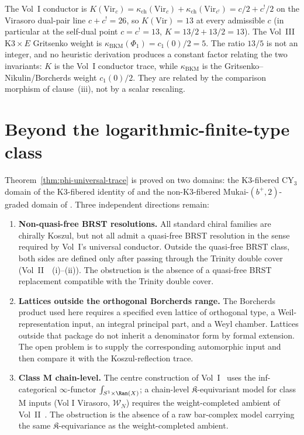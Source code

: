 \begin{remark}
\label{rem:factor-13-caveat}
The Vol~I conductor is
$K(\mathrm{Vir}_c) = \kappa_{\mathrm{ch}}(\mathrm{Vir}_c) + \kappa_{\mathrm{ch}}(\mathrm{Vir}_{c^!})
= c/2 + c^!/2$ on the Virasoro dual-pair line $c + c^! = 26$, so
$K(\mathrm{Vir}) = 13$ at every admissible $c$ (in particular at the
self-dual point $c = c^! = 13$, $K = 13/2 + 13/2 = 13$). The Vol~III
K$3 \times E$ Gritsenko weight is
$\kappa_{\mathrm{BKM}}(\Phi_1) = c_1(0)/2 = 5$. The ratio $13/5$ is not
an integer, and no heuristic derivation produces a constant factor
relating the two invariants: $K$ is the Vol~I conductor trace, while
$\kappa_{\mathrm{BKM}}$ is the Gritsenko--Nikulin/Borcherds weight
$c_1(0)/2$. They are related by the comparison morphism of clause~(iii),
not by a scalar rescaling.
\end{remark}

\section{Beyond the logarithmic-finite-type class}
\label{sec:phi-trace-frontier}

Theorem~\ref{thm:phi-universal-trace} is proved on two domains: the
K$3$-fibered CY$_3$ domain of
the K3-fibered identity of \cite{VolI} and the non-K$3$-fibered
Mukai-$(b^+, 2)$-graded domain of
\cite{VolI}. Three independent
directions remain:

\begin{enumerate}[label=\textup{(\alph*)}]
 \item \textbf{Non-quasi-free BRST resolutions.} All standard chiral
 families are chirally Koszul, but not all admit a quasi-free
 BRST resolution in the sense required by Vol~I's universal
 conductor. Outside the quasi-free BRST class, both sides are
 defined only after passing through the Trinity double cover
 \textup{(}Vol~II~\cite{VolII}~(i)--(ii)\textup{).}
 The obstruction is the absence of a quasi-free BRST replacement
 compatible with the Trinity double cover.
 \item \textbf{Lattices outside the orthogonal Borcherds range.} The
 Borcherds product used here requires a specified even lattice of
 orthogonal type, a Weil-representation input, an integral principal
 part, and a Weyl chamber.  Lattices outside that package do not inherit
 a denominator form by formal extension.  The open problem is to supply
 the corresponding automorphic input and then compare it with the
 Koszul-reflection trace.
 \item \textbf{Class M chain-level.} The centre construction of
 Vol~I~\cite{VolI} uses the
 inf-categorical $\infty$-functor $\int_{S^1 \times \Ran(X)}$;
 a chain-level $\mathfrak{K}$-equivariant model for class M
 inputs (Vol I Virasoro, $\mathcal{W}_N$) requires the
 weight-completed ambient of Vol~II~\cite{VolII}.
 The obstruction is the absence of a raw bar-complex model carrying
 the same $\mathfrak{K}$-equivariance as the weight-completed ambient.
\end{enumerate}

